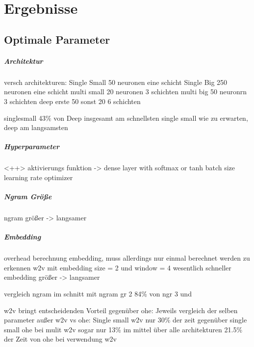 
\chapter{Ergebnisse}\label{ch:erg}
\section{Optimale Parameter}

        \paragraph{Architektur}
            versch architekturen:
            Single Small 50 neuronen eine schicht
            Single Big 250 neuronen eine schicht
            multi small 20 neuronen 3 schichten
            multi big 50 neuronrn 3 schichten
            deep erste 50 sonst 20 6 schichten

            singlesmall 43\% von Deep
            insgesamt am schnellsten single small
            wie zu erwarten,  deep am langsamsten

        \paragraph{Hyperparameter}<++>
            aktivierungs funktion
            -> dense layer with softmax or tanh
            batch size
            learning rate
            optimizer

        \paragraph{Ngram Größe}
            ngram größer -> langsamer

        \paragraph{Embedding}

            overhead berechnung embedding, muss allerdings nur einmal berechnet werden
            zu erkennen w2v mit embedding size = 2  und window = 4 wesentlich schneller
            embedding größer -> langsamer

            vergleich ngram
            im schnitt mit ngram gr 2 84\% von ngr 3 und 

            w2v bringt entscheidenden Vorteil gegenüber ohe:
            Jeweils vergleich der selben parameter außer w2v vs ohe:
            Single small w2v nur 30\% der zeit gegenüber single small ohe
            bei mulit w2v sogar nur 13\%
            im mittel über alle architekturen 21.5\% der Zeit von ohe bei verwendung w2v

